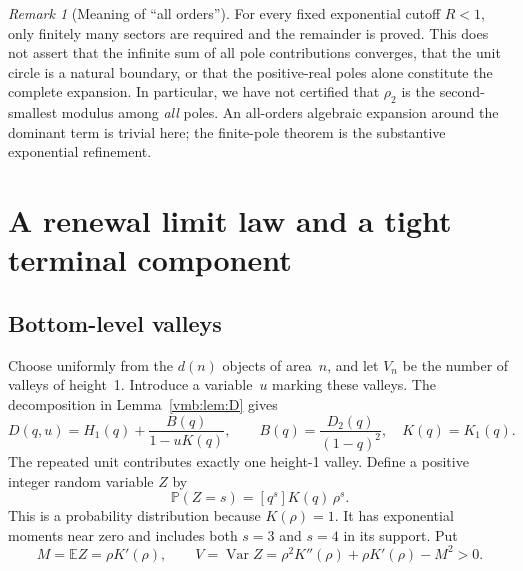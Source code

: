 \documentclass[11pt,a4paper]{article}
\numberwithin{equation}{section}
\theoremstyle{definition}\newtheorem{definition}[theorem]{Definition}
\theoremstyle{remark}\newtheorem{remark}[theorem]{Remark}
\newcommand{\E}{\mathbb E}
\newcommand{\Prob}{\mathbb P}
\newcommand{\Var}{\operatorname{Var}}
\newcommand{\coeff}[2]{[#1^{#2}]}
\begin{document}
\begin{remark}[Meaning of ``all orders'']
For every fixed exponential cutoff \(R<1\), only finitely many sectors
are required and the remainder is proved. This does not assert that the
infinite sum of all pole contributions converges, that the unit circle
is a natural boundary, or that the positive-real poles alone constitute
the complete expansion. In particular, we have not certified that
\(\rho_2\) is the second-smallest modulus among \emph{all} poles.
An all-orders algebraic expansion around the dominant term is trivial
here; the finite-pole theorem is the substantive exponential refinement.
\end{remark}

\section{A renewal limit law and a tight terminal component}

\subsection{Bottom-level valleys}
Choose uniformly from the \(d(n)\) objects of area~\(n\), and let
\(V_n\) be the number of valleys of height~1. Introduce a variable~\(u\)
marking these valleys. The decomposition in Lemma~\ref{vmb:lem:D} gives
\begin{equation}\label{vmb:eq:marked}
D(q,u)=H_1(q)+\frac{B(q)}{1-uK(q)},
\qquad B(q)=\frac{D_2(q)}{(1-q)^2},\quad K(q)=K_1(q).
\end{equation}
The repeated unit contributes exactly one height-1 valley.
Define a positive integer random variable \(Z\) by
\begin{equation}\label{vmb:eq:Z}
\Prob(Z=s)=\coeff qs K(q)\,\rho^s.
\end{equation}
This is a probability distribution because \(K(\rho)=1\). It has
exponential moments near zero and includes both \(s=3\) and \(s=4\)
in its support. Put
\begin{equation}\label{vmb:eq:MV}
M=\E Z=\rho K'(\rho),\qquad
V=\Var Z=\rho^2K''(\rho)+\rho K'(\rho)-M^2>0.
\end{equation}
\end{document}
